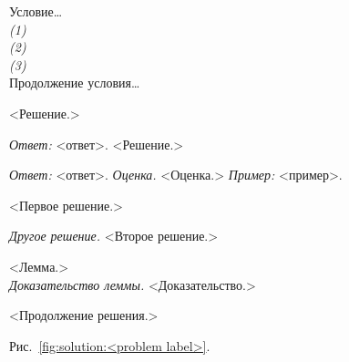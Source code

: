 Условие\ldots
\\\emph{(1)}
\\\emph{(2)}
\\\emph{(3)}
\\
Продолжение условия\ldots

\solution
<Решение.>

\solution
\emph{Ответ:} <ответ>.
<Решение.>

\solution
\emph{Ответ:} <ответ>.
\emph{Оценка.}
<Оценка.>
\emph{Пример:} <пример>.

\solution
<Первое решение.>
\par
\emph{Другое решение.}
<Второе решение.>

\solution
<Лемма.>
\\\emph{Доказательство леммы.}
<Доказательство.>
\par
<Продолжение решения.>

%
\label{solution:<problem label>}
Рис.~\ref{fig:solution:<problem label>}.

